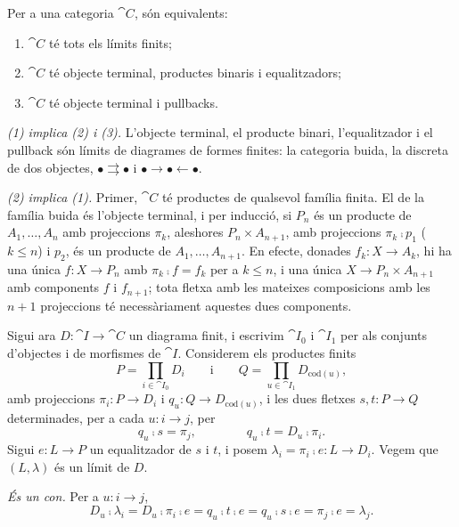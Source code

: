 \begin{teorema}\label{teo:limits-finits}
Per a una categoria $\cat{C}$, són equivalents:
\begin{enumerate}
\item $\cat{C}$ té tots els límits finits;
\item $\cat{C}$ té objecte terminal, productes binaris i equalitzadors;
\item $\cat{C}$ té objecte terminal i pullbacks.
\end{enumerate}
\end{teorema}

\begin{prova}
\emph{(1) implica (2) i (3).} L'objecte terminal, el producte binari, l'equalitzador i el pullback són límits de diagrames de formes finites: la categoria buida, la discreta de dos objectes, $\bullet\rightrightarrows\bullet$ i $\bullet\to\bullet\leftarrow\bullet$.

\emph{(2) implica (1).} Primer, $\cat{C}$ té productes de qualsevol família finita. El de la família buida és l'objecte terminal, i per inducció, si $P_n$ és un producte de $A_1,\dots,A_n$ amb projeccions $\pi_k$, aleshores $P_n\times A_{n+1}$, amb projeccions $\pi_k\comp p_1$ ($k\le n$) i $p_2$, és un producte de $A_1,\dots,A_{n+1}$. En efecte, donades $f_k\colon X\to A_k$, hi ha una única $f\colon X\to P_n$ amb $\pi_k\comp f=f_k$ per a $k\le n$, i una única $X\to P_n\times A_{n+1}$ amb components $f$ i $f_{n+1}$; tota fletxa amb les mateixes composicions amb les $n+1$ projeccions té necessàriament aquestes dues components.

Sigui ara $D\colon\cat{I}\to\cat{C}$ un diagrama finit, i escrivim $\cat{I}_0$ i $\cat{I}_1$ per als conjunts d'objectes i de morfismes de $\cat{I}$. Considerem els productes finits
\[
P=\prod_{i\in\cat{I}_0}D_i
\qquad\text{i}\qquad
Q=\prod_{u\in\cat{I}_1}D_{\mathrm{cod}(u)},
\]
amb projeccions $\pi_i\colon P\to D_i$ i $q_u\colon Q\to D_{\mathrm{cod}(u)}$, i les dues fletxes $s,t\colon P\to Q$ determinades, per a cada $u\colon i\to j$, per
\[
q_u\comp s=\pi_j,
\qquad\qquad
q_u\comp t=D_u\comp\pi_i.
\]
Sigui $e\colon L\to P$ un equalitzador de $s$ i $t$, i posem $\lambda_i=\pi_i\comp e\colon L\to D_i$. Vegem que $(L,\lambda)$ és un límit de $D$.

\emph{És un con.} Per a $u\colon i\to j$,
\[
D_u\comp\lambda_i=D_u\comp\pi_i\comp e=q_u\comp t\comp e=q_u\comp s\comp e=\pi_j\comp e=\lambda_j.
\]


\end{prova}
